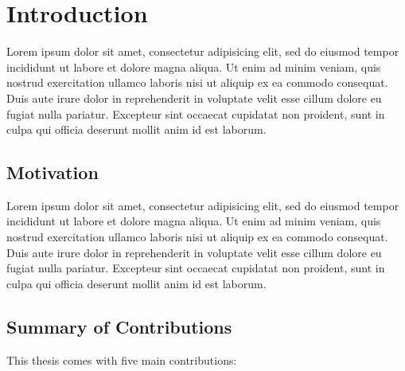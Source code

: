 \chapter{Introduction}\label{ch:introduction}

Lorem ipsum dolor sit amet, consectetur adipisicing elit, sed do eiusmod tempor incididunt ut labore et dolore magna aliqua. Ut enim ad minim veniam, quis nostrud exercitation ullamco laboris nisi ut aliquip ex ea commodo consequat. Duis aute irure dolor in reprehenderit in voluptate velit esse cillum dolore eu fugiat nulla pariatur. Excepteur sint occaecat cupidatat non proident, sunt in culpa qui officia deserunt mollit anim id est laborum.


\section{Motivation}
Lorem ipsum dolor sit amet, consectetur adipisicing elit, sed do eiusmod tempor incididunt ut labore et dolore magna aliqua. Ut enim ad minim veniam, quis nostrud exercitation ullamco laboris nisi ut aliquip ex ea commodo consequat. Duis aute irure dolor in reprehenderit in voluptate velit esse cillum dolore eu fugiat nulla pariatur. Excepteur sint occaecat cupidatat non proident, sunt in culpa qui officia deserunt mollit anim id est laborum.


\clearpage
\section{Summary of Contributions}

This thesis comes with five main contributions:

